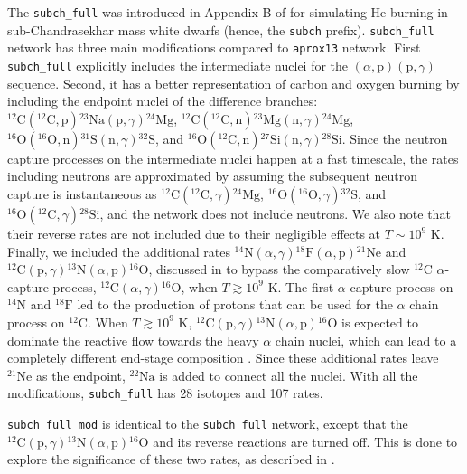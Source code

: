 \documentclass[preprint,times,tighten]{aastex631}
\begin{document}
The {\tt subch\_full} was introduced in Appendix B of \cite{castro_simple_sdc} for simulating He burning in sub-Chandrasekhar mass white dwarfs (hence, the {\tt subch} prefix). {\tt subch\_full} network has three main modifications compared to {\tt aprox13} network. First {\tt subch\_full} explicitly includes the intermediate nuclei for the $(\alpha, \mbox{p})(\mbox{p}, \gamma)$ sequence.  Second, it has
a better representation of carbon and oxygen burning by including the endpoint nuclei of the difference branches: ${}^{12}\mbox{C}({}^{12}\mbox{C}, \mbox{p}) {}^{23}\mbox{Na} (\mbox{p}, \gamma) {}^{24}\mbox{Mg}$, ${}^{12}\mbox{C} ({}^{12}\mbox{C}, \mbox{n}){}^{23}\mbox{Mg} (\mbox{n}, \gamma) {}^{24}\mbox{Mg}$,  ${}^{16}\mbox{O} ({}^{16}\mbox{O}, \mbox{n}){}^{31}\mbox{S} (\mbox{n}, \gamma) {}^{32}\mbox{S}$, and ${}^{16}\mbox{O} ({}^{12}\mbox{C}, \mbox{n}){}^{27}\mbox{Si} (\mbox{n}, \gamma) {}^{28}\mbox{Si}$.  Since the neutron capture processes on the intermediate nuclei happen at a fast timescale, the rates
including neutrons are approximated by assuming the subsequent neutron capture is instantaneous as ${}^{12}\mbox{C} ({}^{12}\mbox{C}, \gamma) {}^{24}\mbox{Mg}$,  ${}^{16}\mbox{O} ({}^{16}\mbox{O}, \gamma) {}^{32}\mbox{S}$, and ${}^{16}\mbox{O} ({}^{12}\mbox{C}, \gamma) {}^{28}\mbox{Si}$, and the network does not include neutrons. We also note that their reverse rates are not included due to their negligible effects at $T \sim 10^9$ K.  Finally, we included the additional rates ${}^{14}\mbox{N}(\alpha,\gamma){}^{18}\mbox{F}(\alpha, \mbox{p}){}^{21}\mbox{Ne}$ and ${}^{12}\mbox{C}(\mbox{p}, \gamma) {}^{13}\mbox{N}(\alpha, \mbox{p}){}^{16}\mbox{O}$, discussed in \cite{Shen_2009, Weinberg_2006,Karakas_2008} to bypass the comparatively slow ${}^{12}$C $\alpha$-capture process, ${}^{12}\mbox{C} (\alpha, \gamma) {}^{16}\mbox{O}$, when $T \gtrsim 10^9$ K. The first $\alpha$-capture process on ${}^{14}\mbox{N}$ and ${}^{18}\mbox{F}$ led to the production of protons that can be used for the $\alpha$ chain process on ${}^{12}\mbox{C}$. When $T \gtrsim 10^9$ K, ${}^{12}\mbox{C}(\mbox{p}, \gamma) {}^{13}\mbox{N}(\alpha, \mbox{p}){}^{16}\mbox{O}$ is expected to dominate the reactive flow towards the heavy $\alpha$ chain nuclei, which can lead to a completely different end-stage composition \citep{Weinberg_2006}. Since these additional rates leave ${}^{21}\mbox{Ne}$ as the endpoint, ${}^{22}\mbox{Na}$ is added to connect all the nuclei. With all the modifications, {\tt subch\_full} has 28 isotopes and 107 rates. 

{\tt subch\_full\_mod} is identical to the {\tt subch\_full} network, except that the ${}^{12}\mbox{C}(\mbox{p}, \gamma) {}^{13}\mbox{N}(\alpha, \mbox{p}){}^{16}\mbox{O}$ and its reverse reactions are turned off. This is done to explore the significance of these two rates, as described in \cite{Shen_2009, Weinberg_2006}. 
\end{document}
